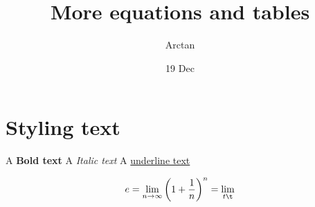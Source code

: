 \documentclass{article}
\title{More equations and tables}
\author{Arctan}
\date{19 Dec}
\begin{document}
\maketitle

\section{Styling text}

A \textbf{Bold text}
A \textit{Italic text}
A \underline{underline text}

    \begin{equation}
        e = \lim_{n\to\infty}\left(1+\frac{1}{n}\right)^n
          = \lim_{t\t}
    \end{equation}
\end{document}
